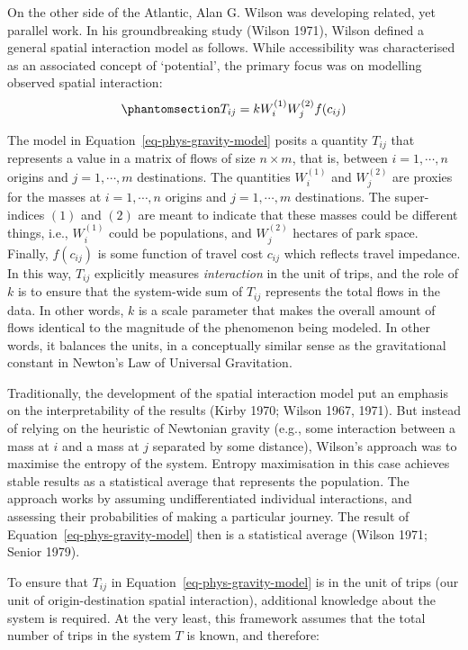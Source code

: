 \documentclass[
]{article}
\begin{document}
On the other side of the Atlantic, Alan G. Wilson was developing
related, yet parallel work. In his groundbreaking study (Wilson 1971),
Wilson defined a general spatial interaction model as follows. While
accessibility was characterised as an associated concept of `potential',
the primary focus was on modelling observed spatial interaction:
\begin{equation}\phantomsection\label{eq-phys-gravity-model}{
T_{ij} = k W_i^{(1)} W_j^{(2)} f(c_{ij})
}\end{equation}

The model in Equation~\ref{eq-phys-gravity-model} posits a quantity
\(T_{ij}\) that represents a value in a matrix of flows of size
\(n \times m\), that is, between \(i = 1,\cdots, n\) origins and
\(j = 1,\cdots, m\) destinations. The quantities \(W_i^{(1)}\) and
\(W_j^{(2)}\) are proxies for the masses at \(i=1,\cdots,n\) origins and
\(j=1,\cdots,m\) destinations. The super-indices \((1)\) and \((2)\) are
meant to indicate that these masses could be different things, i.e.,
\(W_i^{(1)}\) could be populations, and \(W_j^{(2)}\) hectares of park
space. Finally, \(f(c_{ij})\) is some function of travel cost \(c_{ij}\)
which reflects travel impedance. In this way, \(T_{ij}\) explicitly
measures \emph{interaction} in the unit of trips, and the role of \(k\)
is to ensure that the system-wide sum of \(T_{ij}\) represents the total
flows in the data. In other words, \(k\) is a scale parameter that makes
the overall amount of flows identical to the magnitude of the phenomenon
being modeled. In other words, it balances the units, in a conceptually
similar sense as the gravitational constant in Newton's Law of Universal
Gravitation.

Traditionally, the development of the spatial interaction model put an
emphasis on the interpretability of the results (Kirby 1970; Wilson
1967, 1971). But instead of relying on the heuristic of Newtonian
gravity (e.g., some interaction between a mass at \(i\) and a mass at
\(j\) separated by some distance), Wilson's approach was to maximise the
entropy of the system. Entropy maximisation in this case achieves stable
results as a statistical average that represents the population. The
approach works by assuming undifferentiated individual interactions, and
assessing their probabilities of making a particular journey. The result
of Equation~\ref{eq-phys-gravity-model} then is a statistical average
(Wilson 1971; Senior 1979).

To ensure that \(T_{ij}\) in Equation~\ref{eq-phys-gravity-model} is in
the unit of trips (our unit of origin-destination spatial interaction),
additional knowledge about the system is required. At the very least,
this framework assumes that the total number of trips in the system
\(T\) is known, and therefore:
\end{document}
